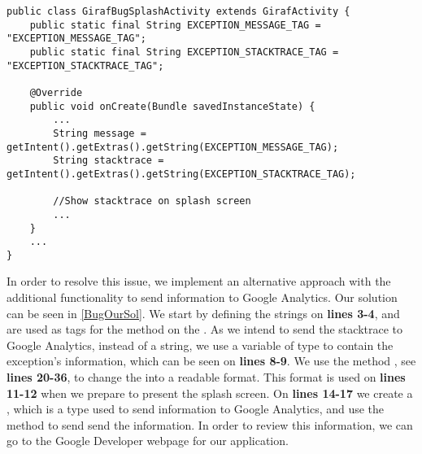 \begin{minipage}[H]{\linewidth}
\begin{lstlisting}[caption = Code responsible for showing the GIRAF splash screen., label = GSplash]
public class GirafBugSplashActivity extends GirafActivity { 
	public static final String EXCEPTION_MESSAGE_TAG = "EXCEPTION_MESSAGE_TAG"; 
	public static final String EXCEPTION_STACKTRACE_TAG = "EXCEPTION_STACKTRACE_TAG";
	
	@Override
    public void onCreate(Bundle savedInstanceState) {
		...
		String message = getIntent().getExtras().getString(EXCEPTION_MESSAGE_TAG);
        String stacktrace = getIntent().getExtras().getString(EXCEPTION_STACKTRACE_TAG);
        
        //Show stacktrace on splash screen
        ...
    }	
	...
}
\end{lstlisting}
\end{minipage}


In order to resolve this issue, we implement an alternative approach with the
additional functionality to send information to Google Analytics. Our solution
can be seen in \autoref{BugOurSol}. We start by defining the strings on
\textbf{lines 3-4},  and  are
used as tags for the  method on the . As we
intend to send the stacktrace to Google Analytics, instead of a string, we use
a variable of type  to contain the exception's information,
which can be seen on \textbf{lines 8-9}. We use the method
, see \textbf{lines 20-36}, to change the
 into a readable format. This format is used on \textbf{lines
11-12} when we prepare to present the splash screen. On \textbf{lines 14-17} we
create a , which is a type used to send information to Google
Analytics, and use the  method to send send the information. In
order to review this information, we can go to the Google Developer webpage for
our application.\nl

